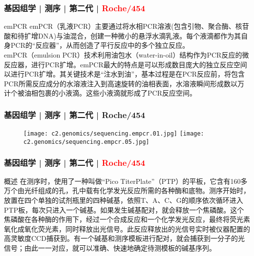 \begin{frame}
  \frametitle{基因组学 | 测序 | 第二代 | \textcolor{red}{Roche/454}}
  \begin{block}{emPCR}
emPCR（乳液PCR）主要通过将水相PCR溶液(包含引物、聚合酶、核苷酸和待扩增DNA)与油混合，创建一种微小的悬浮水滴乳液。每个液滴都作为其自身PCR的“反应器”，从而创造了平行反应中的多个独立反应。\\
\vspace{1em}
emPCR（emulsion PCR）技术利用油包水（water-in-oil）结构作为PCR反应的微反应器，进行PCR扩增。emPCR最大的特点是可以形成数目庞大的独立反应空间以进行PCR扩增。其关键技术是“注水到油”，基本过程是在PCR反应前，将包含PCR所需反应成分的水溶液注入到高速旋转的油相表面，水溶液瞬间形成数以万计个被油相包裹的小液滴。这些小液滴就形成了PCR反应空间。
  \end{block}
\end{frame}

\begin{frame}
  \frametitle{基因组学 | 测序 | 第二代 | Roche/454}
  \begin{figure}
    \centering
    \texttt{[image: c2.genomics/sequencing.empcr.01.jpg]}
    \qquad
    \texttt{[image: c2.genomics/sequencing.empcr.05.jpg]}
  \end{figure}
\end{frame}

\begin{frame}
  \frametitle{基因组学 | 测序 | 第二代 | \textcolor{red}{Roche/454}}
  \begin{block}{概述}
在测序时，使用了一种叫做“Pico TiterPlate”（PTP）的平板，它含有160多万个由光纤组成的孔，孔中载有化学发光反应所需的各种酶和底物。测序开始时，放置在四个单独的试剂瓶里的四种碱基，依照T、A、C、G的顺序依次循环进入PTP板，每次只进入一个碱基。如果发生碱基配对，就会释放一个焦磷酸。这个焦磷酸在各种酶的作用下，经过一个合成反应和一个化学发光反应，最终将荧光素氧化成氧化荧光素，同时释放出光信号。此反应释放出的光信号实时被仪器配置的高灵敏度CCD捕获到。有一个碱基和测序模板进行配对，就会捕获到一分子的光信号；由此一一对应，就可以准确、快速地确定待测模板的碱基序列。
  \end{block}
\end{frame}


